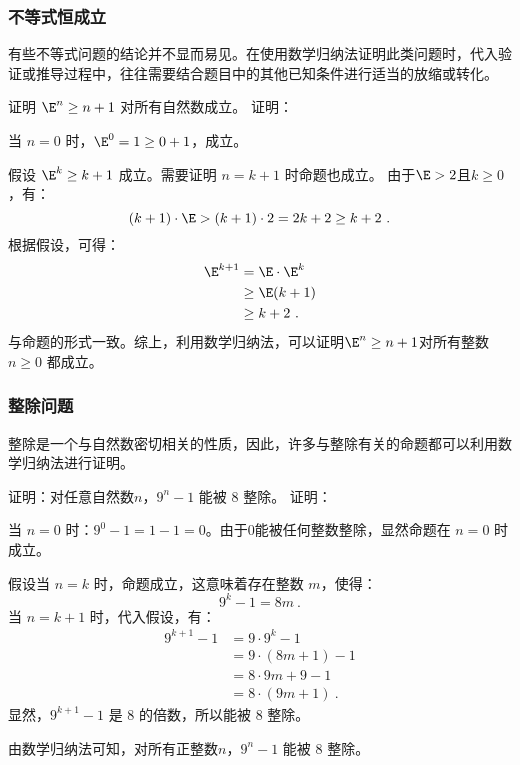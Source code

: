 \subsubsection{不等式恒成立}

有些不等式问题的结论并不显而易见。在使用数学归纳法证明此类问题时，代入验证或推导过程中，往往需要结合题目中的其他已知条件进行适当的放缩或转化。

\begin{example}{证明 $\E^n \geq n+1$ 对所有自然数成立。}
证明：

当 $n = 0$ 时，$\E^0 = 1\geq 0+1$，成立。

假设 $\E^k \geq k+1$ 成立。需要证明 $n = k+1$ 时命题也成立。
由于$\E>2$且$k\geq0$，有：
\begin{equation}
(k + 1) \cdot \E > (k + 1) \cdot 2 = 2k + 2 \geq k + 2~.
\end{equation}
根据假设，可得：
\begin{equation}
\begin{aligned}
\E^{k+1} &= \E \cdot \E^k\\
&\geq \E(k+1)\\
&\geq k+2~.
\end{aligned}
\end{equation}
与命题的形式一致。综上，利用数学归纳法，可以证明$\E^n \geq n+1$对所有整数$n \geq 0$ 都成立。
\end{example}

\subsubsection{整除问题}

整除是一个与自然数密切相关的性质，因此，许多与整除有关的命题都可以利用数学归纳法进行证明。

\begin{example}{证明：对任意自然数$n$，$9^{n} - 1$ 能被 $8$ 整除。}
证明：

当 $n = 0$ 时：$9^0 - 1 = 1 - 1 = 0$。由于$0$能被任何整数整除，显然命题在 $n = 0$ 时成立。

假设当 $n = k$ 时，命题成立，这意味着存在整数 $m$，使得：
\begin{equation}
9^k - 1 = 8m~.
\end{equation}
当 $n = k+1$ 时，代入假设，有：
\begin{equation}
\begin{aligned}
9^{k+1} - 1 &= 9\cdot9^{k} - 1\\
&= 9\cdot(8m+1)- 1\\
&= 8\cdot9m+9- 1\\
&= 8\cdot(9m+1)~.
\end{aligned}
\end{equation}
显然，$9^{k+1} - 1$ 是 $8$ 的倍数，所以能被 $8$ 整除。

由数学归纳法可知，对所有正整数$n$，$9^{n} - 1$ 能被 $8$ 整除。
\end{example}


